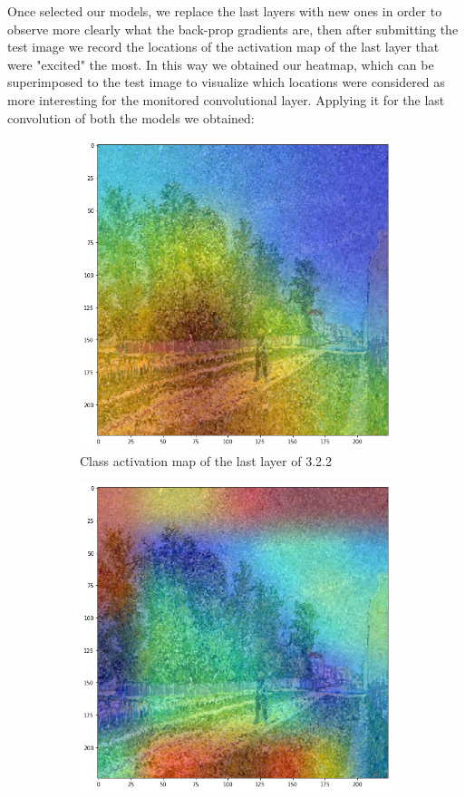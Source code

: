 \noindent Once selected our models, we replace the last layers with new ones in order to observe more clearly what the back-prop gradients are, then after submitting the test image we record the locations of the activation map of the last layer that were "excited" the most. In this way we obtained our heatmap, which can be superimposed to the test image to visualize which locations were considered as more interesting for the monitored convolutional layer. Applying it for the last convolution of both the models we obtained:


\begin{figure}[H]
	\begin{subfigure}{0.5\textwidth}
		\includegraphics[width=0.9\linewidth]{img/scratch/visualization/ad_heatmap.png} 
		\caption{Class activation map of the last layer of 3.2.2}
		\label{fig:ad_heatmap}
	\end{subfigure}
	\begin{subfigure}{0.5\textwidth}
		\includegraphics[width=0.9\linewidth]{img/scratch/visualization/il_heatmap.png}

\end{subfigure}
\end{figure}
